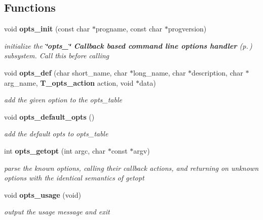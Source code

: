 \subsection*{Functions}
\begin{CompactItemize}
\item 
void {\bf opts\_\-init} (const char $\ast$progname, const char $\ast$progversion)
\begin{CompactList}\small\item\em initialize the {\bf \char`\"{}opts\_\-\char`\"{} Callback based command line options handler} {\rm (p.\,\pageref{group__opts})} subsystem. Call this before calling\item\end{CompactList}\item 
void {\bf opts\_\-def} (char short\_\-name, char $\ast$long\_\-name, char $\ast$description, char $\ast$arg\_\-name, {\bf T\_\-opts\_\-action} action, void $\ast$data)
\begin{CompactList}\small\item\em add the given option to the opts\_\-table\item\end{CompactList}\item 
{}
void {\bf opts\_\-default\_\-opts} ()\label{group__opts_a2}

\begin{CompactList}\small\item\em add the default opts to opts\_\-table\item\end{CompactList}\item 
int {\bf opts\_\-getopt} (int argc, char $\ast$const $\ast$argv)
\begin{CompactList}\small\item\em parse the known options, calling their callback actions, and returning on unknown options with the identical semantics of getopt\item\end{CompactList}\item 
{}
void {\bf opts\_\-usage} (void)\label{group__opts_a4}

\begin{CompactList}\small\item\em output the usage message and exit\item\end{CompactList}\end{CompactItemize}



